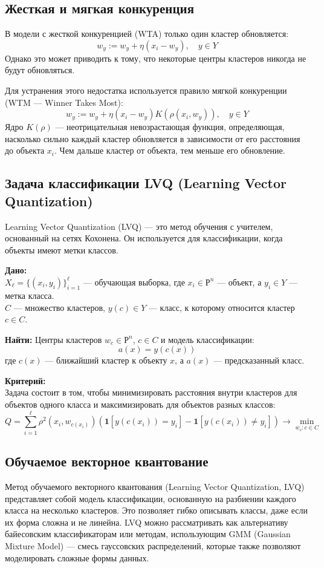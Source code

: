 \begin{itemize}
\subsection{Жесткая и мягкая конкуренция}
В модели с жесткой конкуренцией (WTA) только один кластер обновляется:
\[
w_y := w_y + \eta(x_i - w_y), \quad y \in Y
\]
Однако это может приводить к тому, что некоторые центры кластеров никогда не будут обновляться.

Для устранения этого недостатка используется правило мягкой конкуренции (WTM — Winner Takes Most):
\[
w_y := w_y + \eta(x_i - w_y) K(\rho(x_i, w_y)), \quad y \in Y
\]
Ядро $K(\rho)$ — неотрицательная невозрастающая функция, определяющая, насколько сильно каждый кластер обновляется в зависимости от его расстояния до объекта $x_i$. Чем дальше кластер от объекта, тем меньше его обновление.

\subsection{Задача классификации LVQ (Learning Vector Quantization)}
Learning Vector Quantization (LVQ) — это метод обучения с учителем, основанный на сетях Кохонена. Он используется для классификации, когда объекты имеют метки классов.

\textbf{Дано:}\\  
$X_\ell = \{ (x_i, y_i) \}_{i=1}^{\ell}$ — обучающая выборка, где $x_i \in \mathbb{Р}^n$ — объект, а $y_i \in Y$ — метка класса.\\
$C$ — множество кластеров, $y(c) \in Y$ — класс, к которому относится кластер $c \in C$.

\textbf{Найти:}  
Центры кластеров $w_c \in \mathbb{Р}^n$, $c \in C$ и модель классификации:
\[
a(x) = y(c(x))
\]
где $c(x)$ — ближайший кластер к объекту $x$, а $a(x)$ — предсказанный класс.

\textbf{Критерий:} \\
Задача состоит в том, чтобы минимизировать расстояния внутри кластеров для объектов одного класса и максимизировать для объектов разных классов:
\[
Q = \sum_{i=1}^{\ell} \rho^2(x_i, w_{c(x_i)}) \left( \mathbf{1}[y(c(x_i)) = y_i] - \mathbf{1}[y(c(x_i)) \neq y_i] \right) \to \min_{w_c : c \in C}
\]

\subsection{Обучаемое векторное квантование}
Метод обучаемого векторного квантования (Learning Vector Quantization, LVQ) представляет собой модель классификации, основанную на разбиении каждого класса на несколько кластеров. Это позволяет гибко описывать классы, даже если их форма сложна и не линейна. LVQ можно рассматривать как альтернативу байесовским классификаторам или методам, использующим GMM (Gaussian Mixture Model) — смесь гауссовских распределений, которые также позволяют моделировать сложные формы данных.


\end{itemize}
